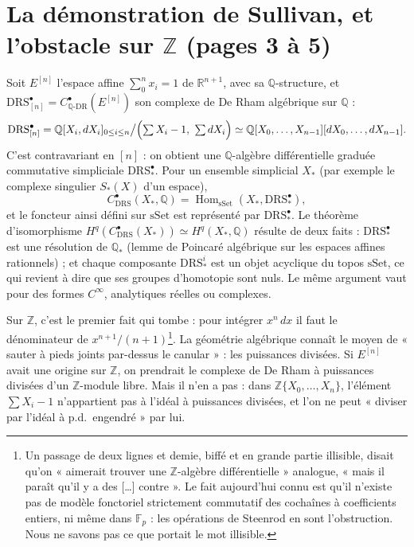 \documentclass[11pt,a4paper]{article}
\begin{document}
\section*{La démonstration de Sullivan, et l'obstacle sur $\mathbb{Z}$ (pages 3 à 5)}

Soit $E^{[n]}$ l'espace affine $\sum_0^n x_i = 1$ de $\mathbb{R}^{n+1}$, avec sa
$\mathbb{Q}$-structure, et
$\mathrm{DRS}^\bullet_{[n]} = C^\bullet_{\mathbb{Q}\text{-DR}}(E^{[n]})$ son
complexe de De Rham algébrique sur $\mathbb{Q}$ :
\[
\mathrm{DRS}^\bullet_{[n]} = \mathbb{Q}[X_i, dX_i]_{0 \leq i \leq n} \big/ \Bigl(\textstyle\sum X_i - 1,\ \sum dX_i\Bigr) \simeq \mathbb{Q}[X_0, \ldots, X_{n-1}][dX_0, \ldots, dX_{n-1}] .
\]
C'est contravariant en $[n]$ : on obtient une $\mathbb{Q}$-algèbre
différentielle graduée commutative simpliciale $\mathrm{DRS}^\bullet_*$. Pour
un ensemble simplicial $X_*$ (par exemple le complexe singulier $S_*(X)$ d'un
espace),
\[
C^\bullet_{\mathrm{DRS}}(X_*, \mathbb{Q}) = \operatorname{Hom}_{\mathrm{sSet}}(X_*, \mathrm{DRS}^\bullet_*) ,
\]
et le foncteur ainsi défini sur $\mathrm{sSet}$ est représenté par
$\mathrm{DRS}^\bullet_*$. Le théorème d'isomorphisme
$H^q(C^\bullet_{\mathrm{DRS}}(X_*)) \simeq H^q(X_*, \mathbb{Q})$ résulte de deux
faits : $\mathrm{DRS}^\bullet_*$ est une résolution de $\mathbb{Q}_*$ (lemme de
Poincaré algébrique sur les espaces affines rationnels) ; et chaque composante
$\mathrm{DRS}^i_*$ est un objet acyclique du topos $\mathrm{sSet}$, ce qui
revient à dire que ses groupes d'homotopie sont nuls. Le même argument vaut
pour des formes $C^\infty$, analytiques réelles ou complexes.

Sur $\mathbb{Z}$, c'est le premier fait qui tombe : pour intégrer $x^n\,dx$ il
faut le dénominateur de $x^{n+1}/(n+1)$\footnote{Un passage de deux lignes et
demie, biffé et en grande partie illisible, disait qu'on « aimerait trouver une
$\mathbb{Z}$-algèbre différentielle » analogue, « mais il paraît qu'il y a des
[\ldots] contre ». Le fait aujourd'hui connu est qu'il n'existe pas de modèle
fonctoriel strictement commutatif des cochaînes à coefficients entiers, ni même
dans $\mathbb{F}_p$ : les opérations de Steenrod en sont l'obstruction. Nous ne
savons pas ce que portait le mot illisible.}. La géométrie algébrique connaît
le moyen de « sauter à pieds joints par-dessus le canular » : les puissances
divisées. Si $E^{[n]}$ avait une origine sur $\mathbb{Z}$, on prendrait le
complexe de De Rham à puissances divisées d'un $\mathbb{Z}$-module libre. Mais
il n'en a pas : dans $\mathbb{Z}\{X_0, \ldots, X_n\}$, l'élément
$\sum X_i - 1$ n'appartient pas à l'idéal à puissances divisées, et l'on ne peut
« diviser par l'idéal à p.d.\ engendré » par lui.
\end{document}
